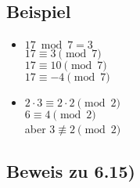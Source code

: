 \documentclass[a4paper, 12pt, twoside] {article}
\begin{document}
\subsection{Beispiel} %
\begin{itemize}

\item $17 \bmod 7 = 3$ \\
$17 \equiv 3 \pmod 7$ \\
$17 \equiv 10 \pmod 7$ \\
$17 \equiv -4 \pmod 7$

\item $2 \cdot 3 \equiv 2 \cdot 2 \pmod 2$ \\
$6 \equiv 4 \pmod 2$ \\
aber $3 \not\equiv 2 \pmod 2$

\end{itemize}

\subsection*{Beweis zu 6.15)}
\end{document}
